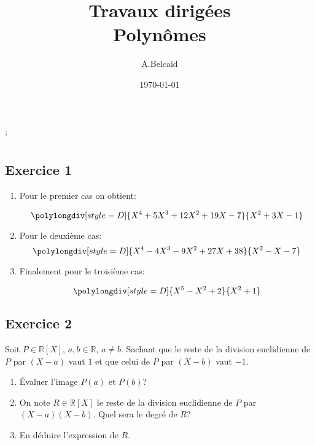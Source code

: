 \documentclass{report}
\title{\Huge{Travaux dirigées}\\ Polynômes}
\author{\huge{A.Belcaid}}
\date{\today}
\begin{document}
\maketitle
\tableofcontents
\pagebreak
\newcommand{\Rr}{\mathbb{R}};
\chapter{}

\section{Exercice 1} %
\label{sec:Exercice 1}

\begin{myproof}

\begin{enumerate}
  \item Pour le premier cas on obtient:

    $$
    \polylongdiv[style=D]{X^4 + 5X^3 + 12X^2 + 19X - 7}{ X^2 + 3X-1}
    $$

  \item Pour le deuxième cas:
    $$
    \polylongdiv[style=D]{X^4-4X^3-9X^2+27X+38}{X^2-X-7}
    $$

  \item Finalement pour le troisième cas:

    $$
    \polylongdiv[style=D]{X^5-X^2+2}{X^2 +1}
    $$
\end{enumerate}

\end{myproof}


\section{Exercice 2} %
\label{sec:Execice 2}
{

Soit $P\in \Rr[X]$, $a,b\in \Rr$, $a\neq b$. Sachant que le reste de la
division euclidienne de $P$ par $(X-a)$ vaut $1$ et que celui de $P$ par
$(X-b)$ vaut $-1$.

\begin{enumerate}
  \item Évaluer l'image $P(a)$ et $P(b)$?
  \item On note $R\in \Rr[X]$ le reste de la division euclidienne de $P$ par
    $(X-a)(X-b)$. Quel  sera le degré de $R$?
  \item En déduire l'expression de $R$.
\end{enumerate}
}
\end{document}
